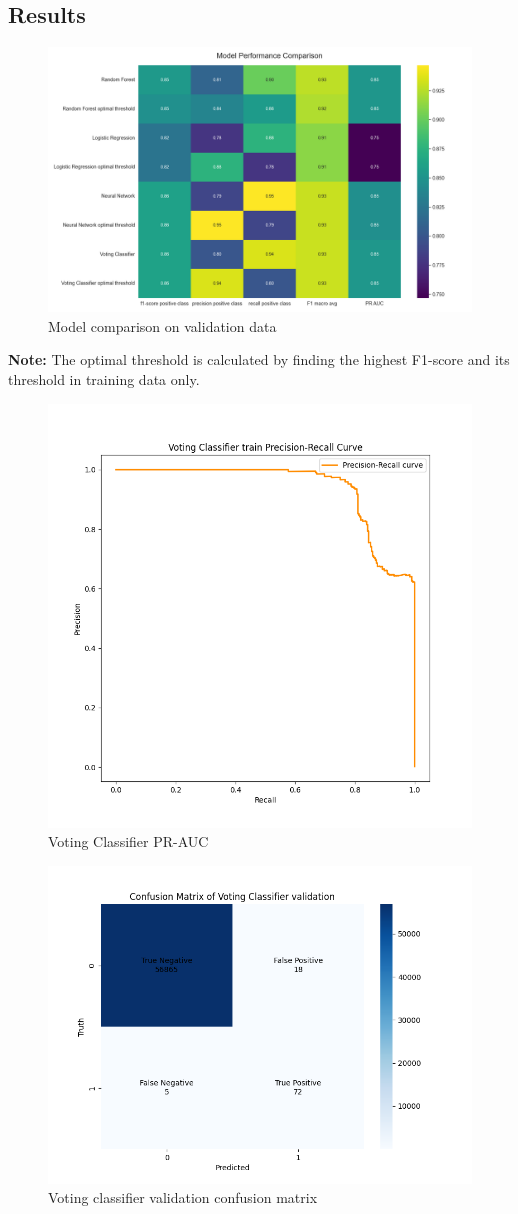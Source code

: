 \subsection{Results}
\begin{figure}[h]
    \centering
    \includegraphics[width=0.74\linewidth]{approach one reaults.png}
    \caption{Model comparison on validation data}
    \label{fig: Model comparison on validation data}
\end{figure}


\newpage
\noindent\textbf{Note:}
\hfill \break
The optimal threshold is calculated by finding the highest F1-score and its threshold in training data only.

\begin{figure}[h]
    \centering
    \includegraphics[width=0.5\linewidth]{Voting Classifier train precision recall area under curve.png}
    \caption{Voting Classifier PR-AUC}
    \label{fig:Voting Classifier PR-AUC}
\end{figure}

\begin{figure}[h]
    \centering
    \includegraphics[width=0.65\linewidth]{Voting Classifier validation confusion matrix.png}
    \caption{Voting classifier validation confusion matrix}
    \label{fig:Voting classifier validation confusion matrix}
\end{figure}


